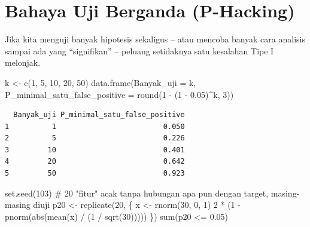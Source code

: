 \documentclass[
  indonesian,
  letterpaper,
]{book}
\newenvironment{Shaded}{\begin{snugshade}}{\end{snugshade}}
\newcommand{\AttributeTok}[1]{\textcolor[rgb]{0.40,0.45,0.13}{#1}}
\newcommand{\CommentTok}[1]{\textcolor[rgb]{0.37,0.37,0.37}{#1}}
\newcommand{\DecValTok}[1]{\textcolor[rgb]{0.68,0.00,0.00}{#1}}
\newcommand{\FloatTok}[1]{\textcolor[rgb]{0.68,0.00,0.00}{#1}}
\newcommand{\FunctionTok}[1]{\textcolor[rgb]{0.28,0.35,0.67}{#1}}
\newcommand{\NormalTok}[1]{\textcolor[rgb]{0.00,0.23,0.31}{#1}}
\newcommand{\OtherTok}[1]{\textcolor[rgb]{0.00,0.23,0.31}{#1}}
\newcommand{\SpecialCharTok}[1]{\textcolor[rgb]{0.37,0.37,0.37}{#1}}
\begin{document}
\section{Bahaya Uji Berganda
(P-Hacking)}\label{bahaya-uji-berganda-p-hacking}

Jika kita menguji banyak hipotesis sekaligus -- atau mencoba banyak cara
analisis sampai ada yang ``signifikan'' -- peluang setidaknya satu
kesalahan Tipe I melonjak.

\begin{Shaded}
\begin{Highlighting}[]
\NormalTok{k }\OtherTok{\textless{}{-}} \FunctionTok{c}\NormalTok{(}\DecValTok{1}\NormalTok{, }\DecValTok{5}\NormalTok{, }\DecValTok{10}\NormalTok{, }\DecValTok{20}\NormalTok{, }\DecValTok{50}\NormalTok{)}
\FunctionTok{data.frame}\NormalTok{(}\AttributeTok{Banyak\_uji =}\NormalTok{ k,}
           \AttributeTok{P\_minimal\_satu\_false\_positive =} \FunctionTok{round}\NormalTok{(}\DecValTok{1} \SpecialCharTok{{-}}\NormalTok{ (}\DecValTok{1} \SpecialCharTok{{-}} \FloatTok{0.05}\NormalTok{)}\SpecialCharTok{\^{}}\NormalTok{k, }\DecValTok{3}\NormalTok{))}
\end{Highlighting}
\end{Shaded}

\begin{verbatim}
  Banyak_uji P_minimal_satu_false_positive
1          1                         0.050
2          5                         0.226
3         10                         0.401
4         20                         0.642
5         50                         0.923
\end{verbatim}

\begin{Shaded}
\begin{Highlighting}[]
\FunctionTok{set.seed}\NormalTok{(}\DecValTok{103}\NormalTok{)}
\CommentTok{\# 20 "fitur" acak tanpa hubungan apa pun dengan target, masing{-}masing diuji}
\NormalTok{p20 }\OtherTok{\textless{}{-}} \FunctionTok{replicate}\NormalTok{(}\DecValTok{20}\NormalTok{, \{}
\NormalTok{  x }\OtherTok{\textless{}{-}} \FunctionTok{rnorm}\NormalTok{(}\DecValTok{30}\NormalTok{, }\DecValTok{0}\NormalTok{, }\DecValTok{1}\NormalTok{)}
  \DecValTok{2} \SpecialCharTok{*}\NormalTok{ (}\DecValTok{1} \SpecialCharTok{{-}} \FunctionTok{pnorm}\NormalTok{(}\FunctionTok{abs}\NormalTok{(}\FunctionTok{mean}\NormalTok{(x) }\SpecialCharTok{/}\NormalTok{ (}\DecValTok{1} \SpecialCharTok{/} \FunctionTok{sqrt}\NormalTok{(}\DecValTok{30}\NormalTok{)))))}
\NormalTok{\})}
\FunctionTok{sum}\NormalTok{(p20 }\SpecialCharTok{\textless{}=} \FloatTok{0.05}\NormalTok{)}
\end{Highlighting}
\end{Shaded}
\end{document}
